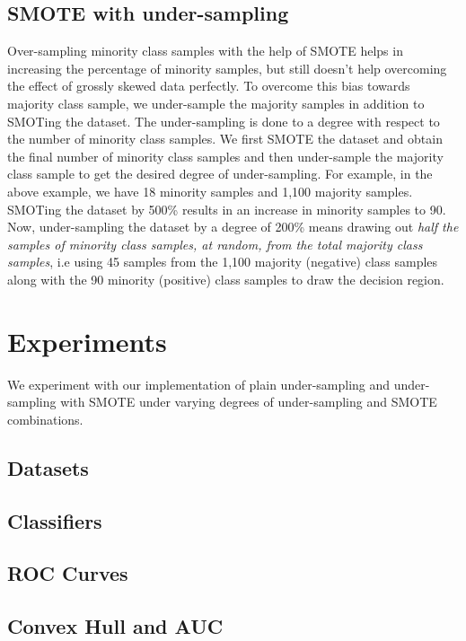 \documentclass[10pt,journal,compsoc]{IEEEtran}
\begin{document}
\subsection{SMOTE with under-sampling}
Over-sampling minority class samples with the help of SMOTE helps in increasing the percentage of minority samples, but still doesn't help overcoming the effect of grossly skewed data perfectly.
To overcome this bias towards majority class sample, we under-sample the majority samples in addition to SMOTing the dataset.
The under-sampling is done to a degree with respect to the number of minority class samples.
We first SMOTE the dataset and obtain the final number of minority class samples and then under-sample the majority class sample to get the desired degree of under-sampling.
For example, in the above example, we have 18 minority samples and 1,100 majority samples. 
SMOTing the dataset by 500\% results in an increase in minority samples to 90.
Now, under-sampling the dataset by a degree of 200\% means drawing out \textit{half the samples of minority class samples, at random, from the total majority class samples}, i.e using 45 samples from the 1,100 majority (negative) class samples along with the 90 minority (positive) class samples to draw the decision region.

\section{Experiments}
We experiment with our implementation of plain under-sampling and under-sampling with SMOTE under varying degrees of under-sampling and SMOTE combinations.
   

\subsection{Datasets}

\subsection{Classifiers}

\subsection{ROC Curves}

\subsection{Convex Hull and AUC}
\end{document}

